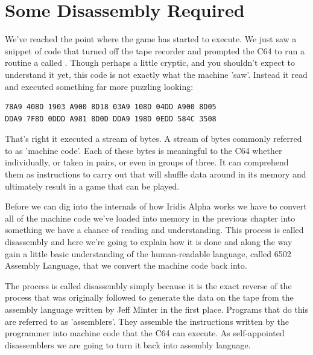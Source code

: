 \chapter{Some Disassembly Required} 
\lstset{style=6502Style}

We've reached the point where the game has started to execute. We just saw a snippet of code that turned off the
tape recorder and prompted the C64 to run a routine a called . Though perhaps a little
cryptic, and you shouldn't expect to understand it yet, this code is not exactly what the machine 'saw'. Instead it read and executed something far more puzzling looking:


\begin{lstlisting}[caption=The first piece of machine code that is executed in Iridis Alpha.,escapechar=\%]
78A9 408D 1903 A900 8D18 03A9 108D 04DD A900 8D05
DDA9 7F8D 0DDD A981 8D0D DDA9 198D 0EDD 584C 3508 
\end{lstlisting}

That's right it executed a stream of bytes. A stream of bytes commonly referred to as 'machine code'. Each of these
bytes is meaningful to the C64 whether individually, or taken in pairs, or even in groups of three. It can comprehend them
as instructions to carry out that will shuffle data around in its memory and ultimately result in a game that
can be played.

Before we can dig into the internals of how Iridis Alpha works we have to convert all of the machine code we've
loaded into memory in the previous chapter into something we have a chance of reading and understanding. This
process is called disassembly and here we're going to explain how it is done and along the way gain a little
basic understanding of the human-readable language, called 6502 Assembly Language, that we convert the machine
code back into.

The process is called disassembly simply because it is the exact reverse of the process that was originally followed
to generate the data on the tape from the assembly language written by Jeff Minter in the first place. Programs that
do this are referred to as 'assemblers'. They assemble the instructions written by the programmer into machine code
that the C64 can execute. As self-appointed disassemblers we are going to turn it back into assembly language.

